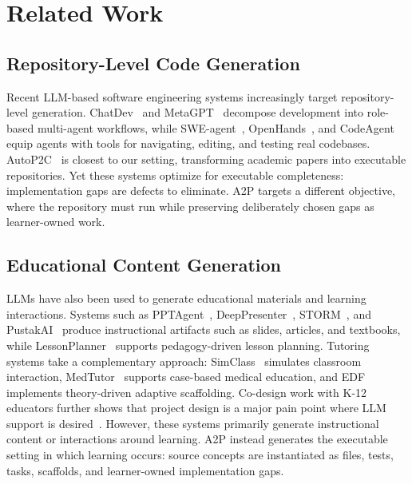 \section{Related Work}

\subsection{Repository-Level Code Generation}

Recent LLM-based software engineering systems increasingly target repository-level generation.
ChatDev~\cite{qian2023chatdev} and MetaGPT~\cite{hong2023metagpt} decompose development into role-based multi-agent workflows, while SWE-agent~\cite{yang2024sweagent}, OpenHands~\cite{wang2024openhands}, and CodeAgent~\cite{zhang2024codeagent} equip agents with tools for navigating, editing, and testing real codebases.
AutoP2C~\cite{shi2025autop2c} is closest to our setting, transforming academic papers into executable repositories.
Yet these systems optimize for executable completeness: implementation gaps are defects to eliminate.
A2P targets a different objective, where the repository must run while preserving deliberately chosen gaps as learner-owned work.

\subsection{Educational Content Generation}

LLMs have also been used to generate educational materials and learning interactions.
Systems such as PPTAgent~\cite{zheng2025pptagent}, DeepPresenter~\cite{zheng2026deeppresenter}, STORM~\cite{shao2024storm}, and PustakAI~\cite{sharma2025pustakai} produce instructional artifacts such as slides, articles, and textbooks, while LessonPlanner~\cite{wang2024lessonplanner} supports pedagogy-driven lesson planning.
Tutoring systems take a complementary approach: SimClass~\cite{zhang2024simclass} simulates classroom interaction, MedTutor~\cite{jang2026medtutor} supports case-based medical education, and EDF~\cite{cohn2026edf} implements theory-driven adaptive scaffolding.
Co-design work with K-12 educators further shows that project design is a major pain point where LLM support is desired~\cite{lee2025codesigning}.
However, these systems primarily generate instructional content or interactions around learning.
A2P instead generates the executable setting in which learning occurs: source concepts are instantiated as files, tests, tasks, scaffolds, and learner-owned implementation gaps.

